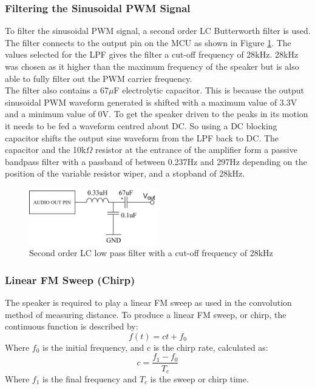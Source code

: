 \subsubsection{Filtering the Sinusoidal PWM Signal}
\label{sec:L_Low_Pass_Filter}
To filter the sinusoidal PWM signal, a second order LC Butterworth filter is used. The filter connects to the output pin on the MCU as shown in Figure \ref{fig:L_LPF}. The values selected for the LPF gives the filter a cut-off frequency of 28kHz. 28kHz was chosen as it higher than the maximum frequency of the speaker but is also able to fully filter out the PWM carrier frequency. \\

The filter also contains a 67$\mu$F electrolytic capacitor. This is because the output sinusoidal PWM waveform generated is shifted with a maximum value of 3.3V and a minimum value of 0V. To get the speaker driven to the peaks in its motion it needs to be fed a waveform centred about DC. So using a DC blocking capacitor shifts the output sine waveform from the LPF back to DC. The capacitor and the 10k$\Omega$ resistor at the entrance of the amplifier form a passive bandpass filter with a passband of between 0.237Hz and 297Hz depending on the position of the variable resistor wiper, and a stopband of 28kHz. \\
\begin{figure} [!htb]
	\hfill\includegraphics[width=0.5\textwidth]{./images/speaker/L_LPF}\hspace{\fill}
	\caption{Second order LC low pass filter with a cut-off frequency of 28kHz}
	\label{fig:L_LPF}
\end{figure} 

\subsubsection{Linear FM Sweep (Chirp)}
\label{sec:L_Chirps}
The speaker is required to play a linear FM sweep as used in the convolution method of measuring distance. To produce a linear FM sweep, or chirp, the continuous function is described by:
\begin{equation}
	f(t) = ct + f_0
	\label{eqn:Chirp1}
\end{equation}
Where $f_0$ is the initial frequency, and c is the chirp rate, calculated as:
\begin{equation}
	c = \frac{f_1 - f_0}{T_c}
\end{equation}
Where $f_1$ is the final frequency and $T_c$ is the sweep or chirp time. \\

